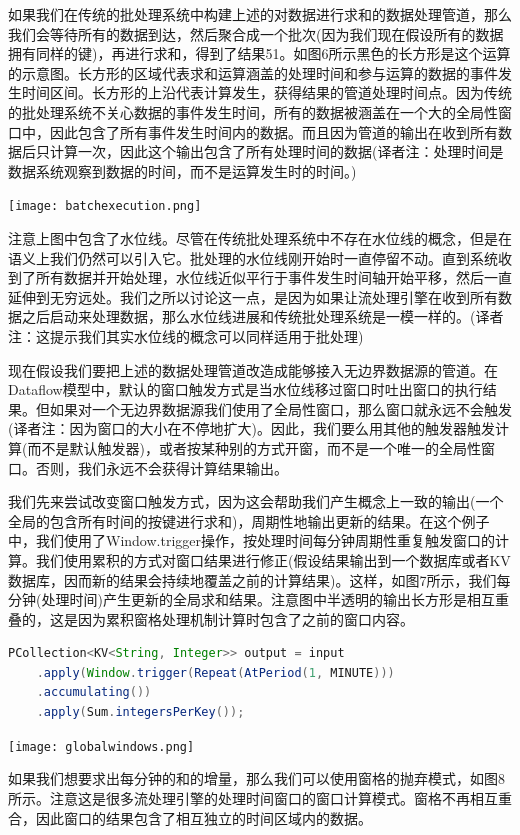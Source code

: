 \documentclass[oneside]{ctexbook}
\begin{document}
如果我们在传统的批处理系统中构建上述的对数据进行求和的数据处理管道，那么我们会等待所有的数据到达，然后聚合成一个批次(因为我们现在假设所有的数据拥有同样的键)，再进行求和，得到了结果51。如图6所示黑色的长方形是这个运算的示意图。长方形的区域代表求和运算涵盖的处理时间和参与运算的数据的事件发生时间区间。长方形的上沿代表计算发生，获得结果的管道处理时间点。因为传统的批处理系统不关心数据的事件发生时间，所有的数据被涵盖在一个大的全局性窗口中，因此包含了所有事件发生时间内的数据。而且因为管道的输出在收到所有数据后只计算一次，因此这个输出包含了所有处理时间的数据(译者注：处理时间是数据系统观察到数据的时间，而不是运算发生时的时间。)

\noindent \texttt{[image: batchexecution.png]}

注意上图中包含了水位线。尽管在传统批处理系统中不存在水位线的概念，但是在语义上我们仍然可以引入它。批处理的水位线刚开始时一直停留不动。直到系统收到了所有数据并开始处理，水位线近似平行于事件发生时间轴开始平移，然后一直延伸到无穷远处。我们之所以讨论这一点，是因为如果让流处理引擎在收到所有数据之后启动来处理数据，那么水位线进展和传统批处理系统是一模一样的。(译者注：这提示我们其实水位线的概念可以同样适用于批处理)

现在假设我们要把上述的数据处理管道改造成能够接入无边界数据源的管道。在Dataflow模型中，默认的窗口触发方式是当水位线移过窗口时吐出窗口的执行结果。但如果对一个无边界数据源我们使用了全局性窗口，那么窗口就永远不会触发(译者注：因为窗口的大小在不停地扩大)。因此，我们要么用其他的触发器触发计算(而不是默认触发器)，或者按某种别的方式开窗，而不是一个唯一的全局性窗口。否则，我们永远不会获得计算结果输出。

我们先来尝试改变窗口触发方式，因为这会帮助我们产生概念上一致的输出(一个全局的包含所有时间的按键进行求和)，周期性地输出更新的结果。在这个例子中，我们使用了Window.trigger操作，按处理时间每分钟周期性重复触发窗口的计算。我们使用累积的方式对窗口结果进行修正(假设结果输出到一个数据库或者KV数据库，因而新的结果会持续地覆盖之前的计算结果)。这样，如图7所示，我们每分钟(处理时间)产生更新的全局求和结果。注意图中半透明的输出长方形是相互重叠的，这是因为累积窗格处理机制计算时包含了之前的窗口内容。

\begin{lstlisting}[language=java]
PCollection<KV<String, Integer>> output = input
    .apply(Window.trigger(Repeat(AtPeriod(1, MINUTE)))
    .accumulating())
    .apply(Sum.integersPerKey());
\end{lstlisting}

\noindent \texttt{[image: globalwindows.png]}

如果我们想要求出每分钟的和的增量，那么我们可以使用窗格的抛弃模式，如图8所示。注意这是很多流处理引擎的处理时间窗口的窗口计算模式。窗格不再相互重合，因此窗口的结果包含了相互独立的时间区域内的数据。
\end{document}
